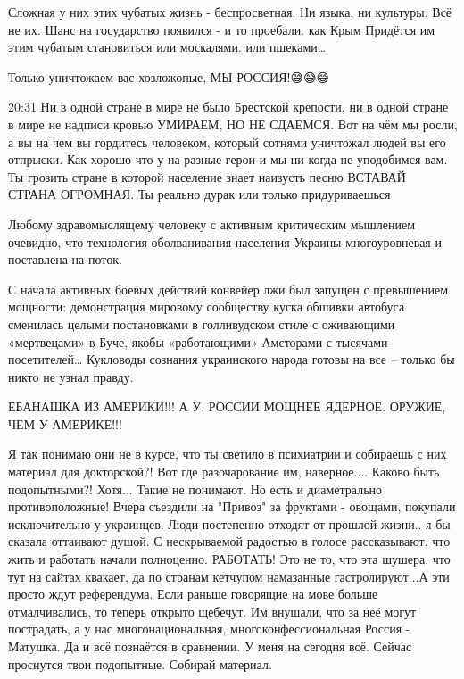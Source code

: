 
Сложная у них этих чубатых жизнь - беспросветная.
Ни языка, ни культуры. Всё не их.
Шанс на государство появился - и то проебали. как Крым
Придётся им этим чубатым становиться или москалями. или пшеками…

Только уничтожаем вас хозложопые, МЫ РОССИЯ!😅😅😅

20:31
Ни в одной стране в мире не было Брестской крепости, ни в одной стране в мире
не надписи кровью УМИРАЕМ, НО НЕ СДАЕМСЯ. Вот на чём мы росли, а вы на чем вы
гордитесь человеком, который сотнями уничтожал людей вы его отпрыски. Как
хорошо что у на разные герои и мы ни когда не уподобимся вам. Ты грозить стране
в которой население знает наизусть песню ВСТАВАЙ СТРАНА ОГРОМНАЯ. Ты реально
дурак или только придуриваешься


Любому здравомыслящему человеку с активным критическим мышлением очевидно, что
технология оболванивания населения Украины многоуровневая и поставлена на
поток.

С начала активных боевых действий конвейер лжи был запущен с превышением
мощности: демонстрация мировому сообществу куска обшивки автобуса сменилась
целыми постановками в голливудском стиле с оживающими «мертвецами» в Буче,
якобы «работающими» Амсторами с тысячами посетителей… Кукловоды сознания
украинского народа готовы на все – только бы никто не узнал правду.


ЕБАНАШКА ИЗ АМЕРИКИ!!! А У. РОССИИ МОЩНЕЕ ЯДЕРНОЕ. ОРУЖИЕ, ЧЕМ У АМЕРИКЕ!!!


Я так понимаю они не в курсе, что ты светило в психиатрии и собираешь с них
материал для докторской?! Вот где разочарование им, наверное.... Каково быть
подопытными?! Хотя... Такие не понимают. Но есть и диаметрально
противоположные! Вчера съездили на "Привоз" за фруктами - овощами, покупали
исключительно у украинцев. Люди постепенно отходят от прошлой жизни.. я бы
сказала оттаивают душой. С нескрываемой радостью в голосе рассказывают, что
жить и работать начали полноценно. РАБОТАТЬ! Это не то, что эта шушера, что тут
на сайтах квакает, да по странам кетчупом намазанные гастролируют...А эти
просто ждут референдума. Если раньше говорящие на мове больше отмалчивались, то
теперь открыто щебечут. Им внушали, что за неё могут пострадать, а у нас
многонациональная, многоконфессиональная Россия - Матушка. Да и всё познаётся в
сравнении. У меня на сегодня всё. Сейчас проснутся твои подопытные. Собирай
материал.

